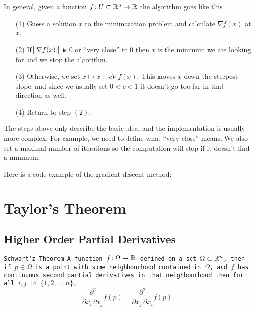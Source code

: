 \documentclass[11pt,a4paper]{article}
\begin{document}
In general, given a function $f \colon U \subset \mathbb{R}^n \to \mathbb{R}$ the algorithm
goes like this
\begin{enumerate}
  \item[(1)] Guess a solution $x$ to the minimazation problem and calculate
    $\nabla f(x)$ at $x$.
  \item[(2)] If $\norm{\nabla f(x)}$ is $0$ or ``very close'' to $0$ then
    $x$ is the minimum we are looking for and we stop the algorithm.
  \item[(3)] Otherwise, we set $x \mapsto x - c \nabla f(x)$.
    This moves $x$ down the steepest slope, and since we usually set
    $0 < c < 1$ it doesn't go too far in that direction as well.
  \item[(4)] Return to step $(2)$.
\end{enumerate}
The steps above only describe the basic idea, and the implementation is usually
more complex.
For example, we need to define what ``very close'' means.
We also set a maximal number of iterations so the computation will stop
if it doesn't find a minimum.

Here is a code example of the gradient descent method:


\newpage

\section{Taylor's Theorem}
\subsection{Higher Order Partial Derivatives}
\begin{theorem}
  \tt{Schwart'z Theorem}
  A function $f \colon \Omega \to \mathbb{R}$ defined
  on a set $\Omega \subset \mathbb{R}^n$, then if $p \in \Omega$ is a point
  with some neighbourhood contained in $\Omega$, and $f$ has continuous
  second partial derivatives in that neighbourhood then for all $i,j$
  in $\{1,2,\dots,n\}$,
  \[
    {\frac {\partial ^{2}}{\partial x_{i}\,
    \partial x_{j}}}f({p})={\frac {\partial ^{2}}{\partial x_{j}\,
    \partial x_{i}}}f({p}).
  \]
\end{theorem}
\end{document}
